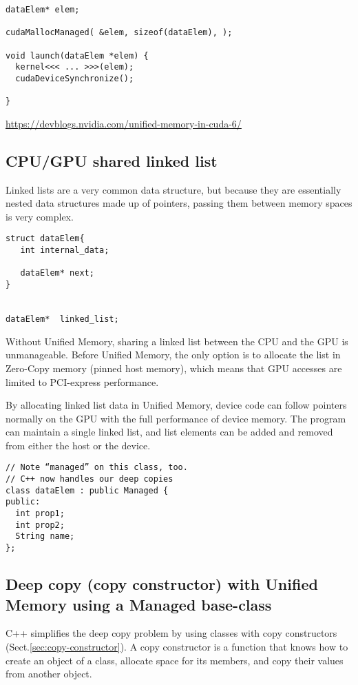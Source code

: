 \begin{verbatim}
dataElem* elem;

cudaMallocManaged( &elem, sizeof(dataElem), );

void launch(dataElem *elem) {
  kernel<<< ... >>>(elem);
  cudaDeviceSynchronize();
  
}
\end{verbatim}

\url{https://devblogs.nvidia.com/unified-memory-in-cuda-6/}

\subsection{CPU/GPU shared linked list}

Linked lists are a very common data structure, but because they are essentially
nested data structures made up of pointers, passing them between memory spaces
is very complex.
\begin{lstlisting}
struct dataElem{
   int internal_data;

   dataElem* next;
}


dataElem*  linked_list;
\end{lstlisting}

Without Unified Memory, sharing a linked list between the CPU and the GPU is
unmanageable.
Before Unified Memory, the only option is to allocate the list in Zero-Copy
memory (pinned host memory), which means that GPU accesses are limited to
PCI-express performance.

By allocating linked list data in Unified Memory, device code can follow
pointers normally on the GPU with the full performance of device memory. The
program can maintain a single linked list, and list elements can be added and
removed from either the host or the device.
 
\begin{lstlisting}
// Note “managed” on this class, too.
// C++ now handles our deep copies
class dataElem : public Managed {
public:
  int prop1;
  int prop2;
  String name;
};
\end{lstlisting}
 
\subsection{Deep copy (copy constructor) with Unified Memory using a Managed base-class}
\label{sec:UnifiedMemory-Managed-baseclass}

C++ simplifies the deep copy problem by using classes with copy constructors
(Sect.\ref{sec:copy-constructor}).
A copy constructor is a function that knows how to create an object of a class,
allocate space for its members, and copy their values from another object.


